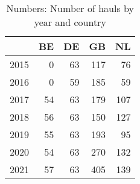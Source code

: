 \begin{table}[ht]
\centering
\begin{tabular}{rrrrr}
  \hline
 & BE & DE & GB & NL \\ 
  \hline
2015 & 0 & 63 & 117 & 76 \\ 
  2016 & 0 & 59 & 185 & 59 \\ 
  2017 & 54 & 63 & 179 & 107 \\ 
  2018 & 56 & 63 & 150 & 127 \\ 
  2019 & 55 & 63 & 193 & 95 \\ 
  2020 & 54 & 63 & 270 & 132 \\ 
  2021 & 57 & 63 & 405 & 139 \\ 
   \hline
\end{tabular}
\caption{Numbers: Number of hauls by year and country} 
\end{table}
